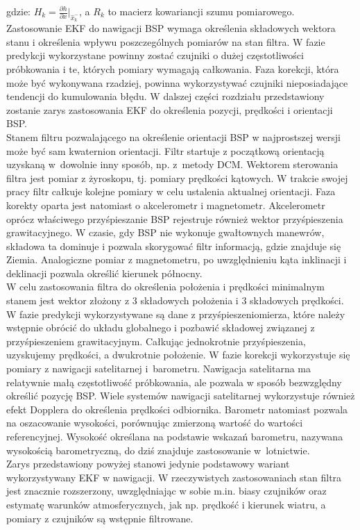 gdzie: $H_k = \frac{\partial h}{\partial x}\Bigr|_{\hat{x}_k^-}$, a $R_k$ to macierz kowariancji szumu pomiarowego.
\\

Zastosowanie EKF do nawigacji BSP wymaga określenia składowych wektora stanu i określenia wpływu poszczególnych pomiarów na stan filtra. W fazie predykcji wykorzystane powinny zostać czujniki o dużej częstotliwości próbkowania i te, których pomiary wymagają całkowania. Faza korekcji, która może być wykonywana rzadziej, powinna wykorzystywać czujniki nieposiadające tendencji do kumulowania błędu. W dalszej części rozdziału przedstawiony zostanie zarys zastosowania EKF do określenia pozycji, prędkości i orientacji BSP.\\

Stanem filtru pozwalającego na określenie orientacji BSP w najprostszej wersji może być sam kwaternion orientacji. Filtr startuje z początkową orientacją uzyskaną w~dowolnie inny sposób, np. z~metody DCM. Wektorem sterowania filtra jest pomiar z żyroskopu, tj. pomiary prędkości kątowych. W trakcie swojej pracy filtr całkuje kolejne pomiary w celu ustalenia aktualnej orientacji. Faza korekty oparta jest natomiast o akcelerometr i magnetometr. Akcelerometr oprócz właściwego przyśpieszanie BSP rejestruje również wektor przyśpieszenia grawitacyjnego. W czasie, gdy BSP nie wykonuje gwałtownych manewrów, składowa ta dominuje i pozwala skorygować filtr informacją, gdzie znajduje się Ziemia. Analogiczne pomiar z magnetometru, po uwzględnieniu kąta inklinacji i deklinacji pozwala określić kierunek północny.\\

W celu zastosowania filtra do określenia położenia i prędkości minimalnym stanem jest wektor złożony z 3 składowych położenia i 3 składowych prędkości. W fazie predykcji wykorzystywane są dane z przyśpieszeniomierza, które należy wstępnie obrócić do układu globalnego i pozbawić składowej związanej z przyśpieszeniem grawitacyjnym. Całkując jednokrotnie przyśpieszenia, uzyskujemy prędkości, a dwukrotnie położenie. W fazie korekcji wykorzystuje się pomiary z nawigacji satelitarnej i~barometru. Nawigacja satelitarna ma relatywnie małą częstotliwość próbkowania, ale pozwala w sposób bezwzględny określić pozycję BSP. Wiele systemów nawigacji satelitarnej wykorzystuje również efekt Dopplera do określenia prędkości odbiornika. Barometr natomiast pozwala na oszacowanie wysokości, porównując zmierzoną wartość do wartości referencyjnej. Wysokość określana na podstawie wskazań barometru, nazywana wysokością barometryczną, do dziś znajduje zastosowanie w~lotnictwie.\\

Zarys przedstawiony powyżej stanowi jedynie podstawowy wariant wykorzystywany EKF w nawigacji. W rzeczywistych zastosowaniach stan filtra jest znacznie rozszerzony, uwzględniając w sobie m.in. biasy czujników oraz estymatę warunków atmosferycznych, jak np. prędkość i kierunek wiatru, a pomiary z czujników są wstępnie filtrowane.


